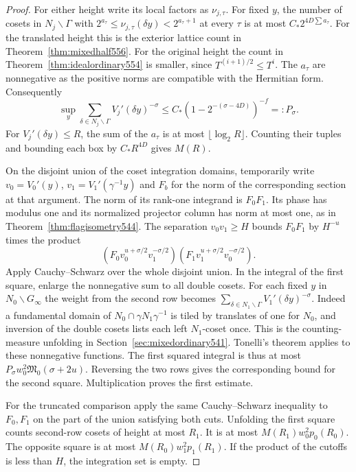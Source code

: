 \documentclass[a4paper,11pt]{article}
\theoremstyle{definition}
\theoremstyle{remark}
\numberwithin{equation}{section}
\begin{document}
\begin{proof}
For either height write its local factors as \(\nu_{j,\tau}\).
For fixed \(y\), the number of cosets in \(N_j\backslash\Gamma\)
with \(2^{a_\tau}\le\nu_{j,\tau}(\delta y)<2^{a_\tau+1}\)
at every \(\tau\) is at most \(C_*2^{4D\sum a_\tau}\).
For the translated height this is the exterior lattice count
in Theorem~\ref{thm:mixedhalf556}. For the original height
the count in Theorem~\ref{thm:idealordinary554} is smaller,
since \(T^{(i+1)/2}\le T^i\). The \(a_\tau\) are nonnegative
as the positive norms are compatible with the Hermitian form.
Consequently
\[
 \sup_y\sum_{\delta\in N_j\backslash\Gamma}
             V_j'(\delta y)^{-\sigma}
 \le C_*(1-2^{-(\sigma-4D)})^{-f}=:P_\sigma .
\]
For \(V_j'(\delta y)\le R\), the sum of the \(a_\tau\) is at
most \(\lfloor\log_2 R\rfloor\). Counting their tuples and
bounding each box by \(C_*R^{4D}\) gives \(M(R)\).

On the disjoint union of the coset integration domains,
temporarily write \(v_0=V_0'(y)\), \(v_1=V_1'(\gamma^{-1}y)\)
and \(F_b\) for the norm of the corresponding section at
that argument. The norm of its rank-one integrand is
\(F_0F_1\). Its phase has modulus one and its normalized
projector column has norm at most one, as in
Theorem~\ref{thm:flagisometry544}. The separation
\(v_0v_1\ge H\) bounds \(F_0F_1\) by \(H^{-u}\) times
the product
\[
 (F_0v_0^{u+\sigma/2}v_1^{-\sigma/2})
 (F_1v_1^{u+\sigma/2}v_0^{-\sigma/2}).
\]
Apply Cauchy--Schwarz over the whole disjoint union. In the
integral of the first square, enlarge the nonnegative sum to
all double cosets. For each fixed \(y\) in
\(N_0\backslash G_\infty\) the weight from the second row
becomes \(\sum_{\delta\in N_1\backslash\Gamma}
V_1'(\delta y)^{-\sigma}\).
Indeed a fundamental domain of
\(N_0\cap\gamma N_1\gamma^{-1}\) is tiled by translates
of one for \(N_0\), and inversion of the double cosets lists
each left \(N_1\)-coset once. This is the counting-measure
unfolding in Section~\ref{sec:mixedordinary541}. Tonelli's
theorem applies to these nonnegative functions.
The first squared integral is thus at most
\(P_\sigma w_0^2\mathfrak M_0(\sigma+2u)\). Reversing the
two rows gives the corresponding bound for the second square.
Multiplication proves the first estimate.

For the truncated comparison apply the same Cauchy--Schwarz
inequality to \(F_0,F_1\) on the part of the union satisfying
both cuts. Unfolding the first square counts second-row
cosets of height at most \(R_1\). It is at most
\(M(R_1)w_0^2p_0(R_0)\). The opposite square is at most
\(M(R_0)w_1^2p_1(R_1)\). If the product of the cutoffs is
less than \(H\), the integration set is empty.
\end{proof}
\end{document}
